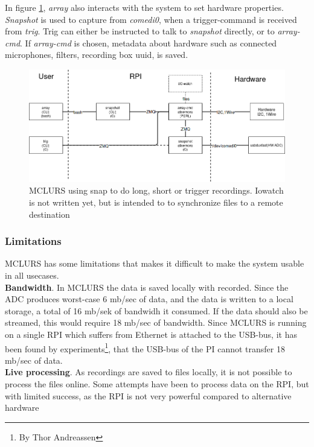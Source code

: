 In figure \ref{fig:mclurs:snapshot}, \textit{array} also interacts with the system to set hardware properties. \textit{Snapshot} is used to capture from \textit{comedi0}, when a trigger-command is received from \textit{trig}.
Trig can either be instructed to talk to \textit{snapshot} directly, or to \textit{array-cmd}. If \textit{array-cmd} is chosen, metadata about hardware such as connected microphones, filters, recording box uuid, is saved.

\begin{figure}[h!]
	\centering
	\includegraphics[width=\textwidth]{figures/mclurs_app2}
	\caption{MCLURS using snap to do long, short or trigger recordings. Iowatch is not written yet, but is intended to to synchronize files to a remote destination} \label{fig:mclurs:snapshot}
\end{figure}

\subsubsection{Limitations} \label{sec:exisingsystem:limitations}
MCLURS has some limitations that makes it difficult to make the system usable in all usecases.  \\

\textbf{Bandwidth}. In MCLURS the data is saved locally with recorded. Since the ADC produces worst-case 6 mb/sec of data, and the data is written to a local storage, a total of 16 mb/sek of bandwidh it consumed. If the data should also be streamed, this would require 18 mb/sec of bandwidth. Since MCLURS is running on a single RPI which suffers from Ethernet is attached to the USB-bus, it has been found by experiments\footnote{By Thor Andreassen}, that the USB-bus of the PI cannot transfer 18 mb/sec of data.\\

\textbf{Live processing}. As recordings are saved to files locally, it is not possible to process the files online. Some attempts have been to process data on the RPI, but with limited success, as the RPI is not very powerful compared to alternative hardware \\

